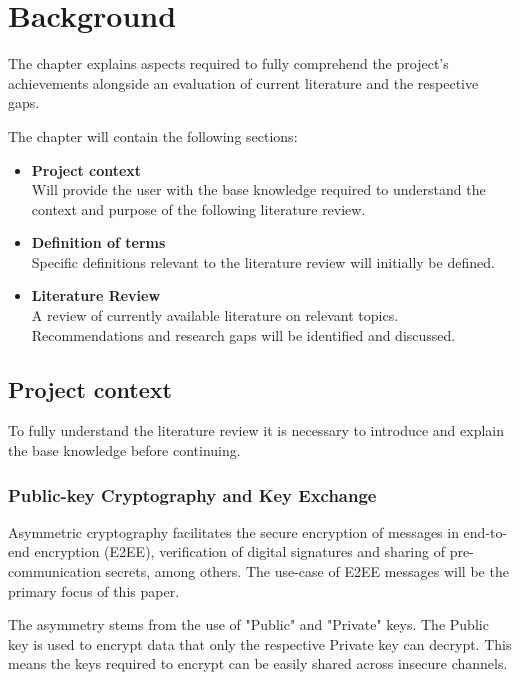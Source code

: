 \chapter{Background}
\label{cha:LiteratureReview}

The chapter explains aspects required to fully comprehend the project's achievements alongside an evaluation of current literature and the respective gaps.

The chapter will contain the following sections:

\begin{itemize}
    \item \textbf{Project context} \\ 
    Will provide the user with the base knowledge required to understand the context and purpose of the following literature review.
    
    \item \textbf{Definition of terms}\\
    Specific definitions relevant to the literature review will initially be defined.
    
    \item \textbf{Literature Review} \\
    A review of currently available literature on relevant topics. Recommendations and research gaps will be identified and discussed.

\end{itemize}

\section{Project context}

To fully understand the literature review it is necessary to introduce and explain the base knowledge before continuing.

\subsection*{Public-key Cryptography and Key Exchange}

Asymmetric cryptography facilitates the secure encryption of messages in end-to-end encryption (E2EE), verification of digital signatures and sharing of pre-communication secrets, among others. The use-case of E2EE messages will be the primary focus of this paper.

The asymmetry stems from the use of "Public" and "Private" keys. The Public key is used to encrypt data that only the respective Private key can decrypt. This means the keys required to encrypt can be easily shared across insecure channels.

